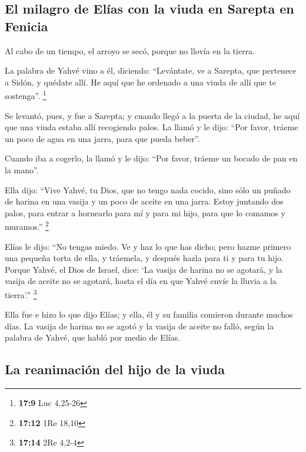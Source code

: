 \begin{paracol}{2}
\hypertarget{el-milagro-de-eluxedas-con-la-viuda-en-sarepta-en-fenicia}{%
\subsection{El milagro de Elías con la viuda en Sarepta en
Fenicia}\label{el-milagro-de-eluxedas-con-la-viuda-en-sarepta-en-fenicia}}

 Al cabo de un tiempo, el arroyo se secó, porque no llovía
en la tierra.

 La palabra de Yahvé vino a él, diciendo: 
``Levántate, ve a Sarepta, que pertenece a Sidón, y quédate allí. He
aquí que he ordenado a una viuda de allí que te sostenga''. \footnote{\textbf{17:9}
  Luc 4,25-26}

 Se levantó, pues, y fue a Sarepta; y cuando llegó a la
puerta de la ciudad, he aquí que una viuda estaba allí recogiendo palos.
La llamó y le dijo: ``Por favor, tráeme un poco de agua en una jarra,
para que pueda beber''.

 Cuando iba a cogerlo, la llamó y le dijo: ``Por favor,
tráeme un bocado de pan en la mano''.

 Ella dijo: ``Vive Yahvé, tu Dios, que no tengo nada
cocido, sino sólo un puñado de harina en una vasija y un poco de aceite
en una jarra. Estoy juntando dos palos, para entrar a hornearlo para mí
y para mi hijo, para que lo comamos y muramos.'' \footnote{\textbf{17:12}
  1Re 18,10}

 Elías le dijo: ``No tengas miedo. Ve y haz lo que has
dicho; pero hazme primero una pequeña torta de ella, y tráemela, y
después hazla para ti y para tu hijo.  Porque Yahvé, el
Dios de Israel, dice: `La vasija de harina no se agotará, y la vasija de
aceite no se agotará, hasta el día en que Yahvé envíe la lluvia a la
tierra'.'' \footnote{\textbf{17:14} 2Re 4,2-4}

 Ella fue e hizo lo que dijo Elías; y ella, él y su
familia comieron durante muchos días.  La vasija de
harina no se agotó y la vasija de aceite no falló, según la palabra de
Yahvé, que habló por medio de Elías.

\hypertarget{la-reanimaciuxf3n-del-hijo-de-la-viuda}{%
\subsection{La reanimación del hijo de la
viuda}\label{la-reanimaciuxf3n-del-hijo-de-la-viuda}}


\end{paracol}
